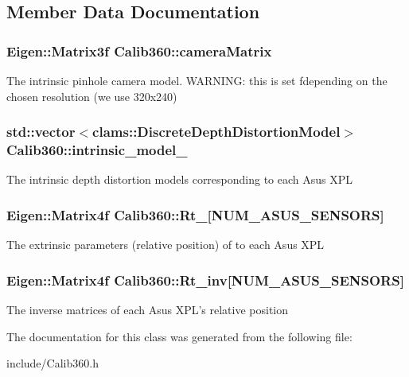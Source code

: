 \subsection{Member Data Documentation}
\hypertarget{classCalib360_a27be5251d6ba2a81b6be00424c82b736}{
\subsubsection[{camera\-Matrix}]{\setlength{\rightskip}{0pt plus 5cm}Eigen\-::\-Matrix3f Calib360\-::camera\-Matrix}}\label{classCalib360_a27be5251d6ba2a81b6be00424c82b736}
The intrinsic pinhole camera model. W\-A\-R\-N\-I\-N\-G\-: this is set fdepending on the chosen resolution (we use 320x240) \hypertarget{classCalib360_aa2e0b8086073711793812d4253b272ec}{
\subsubsection[{intrinsic\-\_\-model\-\_\-}]{\setlength{\rightskip}{0pt plus 5cm}std\-::vector$<$clams\-::\-Discrete\-Depth\-Distortion\-Model$>$ Calib360\-::intrinsic\-\_\-model\-\_\-}}\label{classCalib360_aa2e0b8086073711793812d4253b272ec}
The intrinsic depth distortion models corresponding to each Asus X\-P\-L \hypertarget{classCalib360_a61dacdf729067dcea6d270f79e628b83}{
\subsubsection[{Rt\-\_\-}]{\setlength{\rightskip}{0pt plus 5cm}Eigen\-::\-Matrix4f Calib360\-::\-Rt\-\_\-\mbox{[}N\-U\-M\-\_\-\-A\-S\-U\-S\-\_\-\-S\-E\-N\-S\-O\-R\-S\mbox{]}}}\label{classCalib360_a61dacdf729067dcea6d270f79e628b83}
The extrinsic parameters (relative position) of to each Asus X\-P\-L \hypertarget{classCalib360_a179de6c9f42a6b1bbd4cfda04e857bda}{
\subsubsection[{Rt\-\_\-inv}]{\setlength{\rightskip}{0pt plus 5cm}Eigen\-::\-Matrix4f Calib360\-::\-Rt\-\_\-inv\mbox{[}N\-U\-M\-\_\-\-A\-S\-U\-S\-\_\-\-S\-E\-N\-S\-O\-R\-S\mbox{]}}}\label{classCalib360_a179de6c9f42a6b1bbd4cfda04e857bda}
The inverse matrices of each Asus X\-P\-L's relative position 

The documentation for this class was generated from the following file\-:\begin{DoxyCompactItemize}
\item 
include/Calib360.\-h\end{DoxyCompactItemize}
